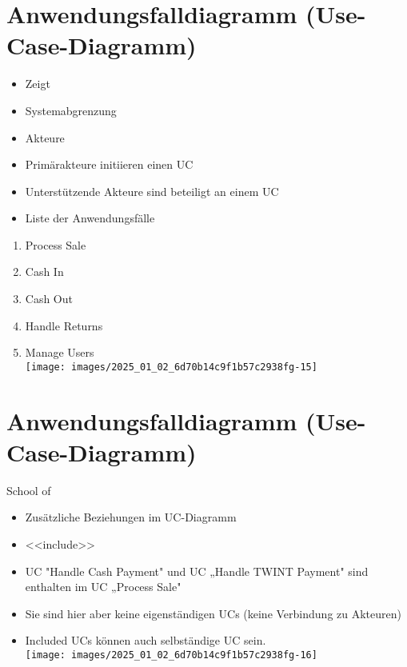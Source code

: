 \documentclass[10pt]{article}
\begin{document}
\section*{Anwendungsfalldiagramm (Use-Case-Diagramm)}
\begin{itemize}
  \item Zeigt
  \item Systemabgrenzung
  \item Akteure
  \item Primärakteure initiieren einen UC
  \item Unterstützende Akteure sind beteiligt an einem UC
  \item Liste der Anwendungsfälle
\end{itemize}

\begin{enumerate}
  \item Process Sale
  \item Cash In
  \item Cash Out
  \item Handle Returns
  \item Manage Users\\
\texttt{[image: images/2025\_01\_02\_6d70b14c9f1b57c2938fg-15]}
\end{enumerate}

\section*{Anwendungsfalldiagramm (Use-Case-Diagramm)}
School of

\begin{itemize}
  \item Zusätzliche Beziehungen im UC-Diagramm
  \item <<include>>
  \item UC "Handle Cash Payment" und UC „Handle TWINT Payment" sind enthalten im UC „Process Sale"
  \item Sie sind hier aber keine eigenständigen UCs (keine Verbindung zu Akteuren)
  \item Included UCs können auch selbständige UC sein.\\
\texttt{[image: images/2025\_01\_02\_6d70b14c9f1b57c2938fg-16]}
\end{itemize}
\end{document}
